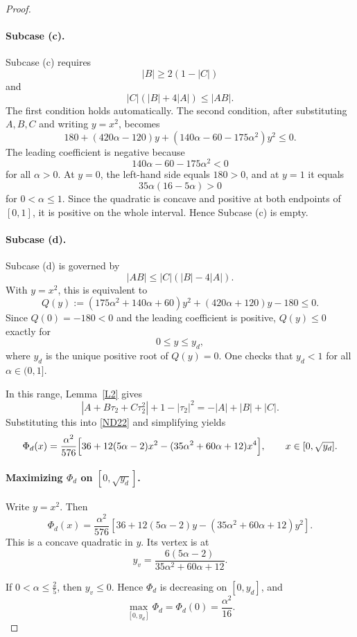 \documentclass[10pt,a4paper]{amsart}
\numberwithin{equation}{section}
\begin{document}
\begin{proof}
\paragraph{Subcase (c).}
Subcase (c) requires
\[
|B|\ge 2(1-|C|)
\]
and
\[
|C|(|B|+4|A|)\le |AB|.
\]
The first condition holds automatically. The second condition, after substituting $A,B,C$ and writing $y=x^2$, becomes
\[
180+(420\alpha-120)y+(140\alpha-60-175\alpha^2)y^2\le 0.
\]
The leading coefficient is negative because
\[
140\alpha-60-175\alpha^2<0
\]
for all $\alpha>0$. At $y=0$, the left-hand side equals $180>0$, and at $y=1$ it equals
\[
35\alpha(16-5\alpha)>0
\]
for $0<\alpha\le 1$. Since the quadratic is concave and positive at both endpoints of $[0,1]$, it is positive on the whole interval. Hence Subcase (c) is empty.

\paragraph{Subcase (d).}
Subcase (d) is governed by
\[
|AB|\le |C|(|B|-4|A|).
\]
With $y=x^2$, this is equivalent to
\begin{equation}\label{Qineq}
Q(y):=(175\alpha^2+140\alpha+60)y^2+(420\alpha+120)y-180\le 0.
\end{equation}
Since $Q(0)=-180<0$ and the leading coefficient is positive, $Q(y)\le 0$ exactly for
\[
0\le y\le y_d,
\]
where $y_d$ is the unique positive root of $Q(y)=0$. One checks that $y_d<1$ for all $\alpha\in(0,1]$.

In this range, Lemma~\ref{L2} gives
\[
|A+B\tau_2+C\tau_2^2|+1-|\tau_2|^2
=
-|A|+|B|+|C|.
\]
Substituting this into \eqref{ND22} and simplifying yields
\begin{equation}\label{phi_d}
\Phi_d(x)
=
\frac{\alpha^2}{576}
\Bigl[
36+12(5\alpha-2)x^2-(35\alpha^2+60\alpha+12)x^4
\Bigr],
\qquad x\in[0,\sqrt{y_d}].
\end{equation}

\paragraph{Maximizing $\Phi_d$ on $[0,\sqrt{y_d}]$.}
Write $y=x^2$. Then
\[
\Phi_d(x)
=
\frac{\alpha^2}{576}
\left[
36+12(5\alpha-2)y-(35\alpha^2+60\alpha+12)y^2
\right].
\]
This is a concave quadratic in $y$. Its vertex is at
\[
y_v=\frac{6(5\alpha-2)}{35\alpha^2+60\alpha+12}.
\]

If $0<\alpha\le \frac25$, then $y_v\le 0$. Hence $\Phi_d$ is decreasing on $[0,y_d]$, and
\[
\max_{[0,y_d]}\Phi_d=\Phi_d(0)=\frac{\alpha^2}{16}.
\]


\end{proof}
\end{document}
